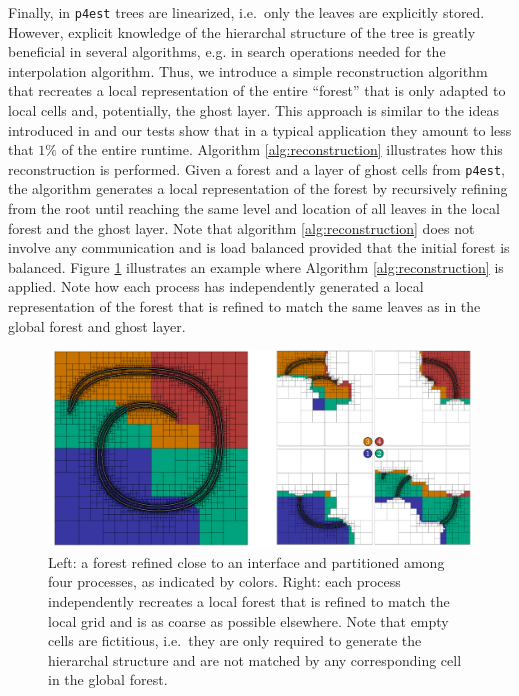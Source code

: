 Finally, in \texttt{p4est} trees are linearized, i.e.\ only the leaves are explicitly stored. However, explicit knowledge of the hierarchal structure of the tree is greatly beneficial in several algorithms, e.g. in search operations needed for the interpolation algorithm. Thus, we introduce a simple reconstruction algorithm that recreates a local representation of the entire ``forest'' that is only adapted to local cells and, potentially, the ghost layer. This approach is similar to the ideas introduced in \cite{Bangerth;Burstedde;Heister;etal:11:Algorithms-and-data-} and our tests show that in a typical application they amount to less that $1\%$ of the entire runtime. Algorithm \ref{alg:reconstruction} illustrates how this reconstruction is performed. Given a forest and a layer of ghost cells from \texttt{p4est}, the algorithm generates a local representation of the forest by recursively refining from the root until reaching the same level and location of all leaves in the local forest and the ghost layer. Note that algorithm \ref{alg:reconstruction} does not involve any communication and is load balanced provided that the initial forest is balanced. Figure \ref{fig:reconstruction} illustrates an example where Algorithm \ref{alg:reconstruction} is applied. Note how each process has independently generated a local representation of the forest that is refined to match the same leaves as in the global forest and ghost layer.
\begin{figure}[htbp]
\begin{center}
\includegraphics[width = \textwidth]{figures/reconstruct.pdf}
\end{center}
\caption{Left: a forest refined close to an interface and partitioned among four processes, as indicated by colors. Right: each process independently recreates a local forest that is refined to match the local grid and is as coarse as possible elsewhere. Note that empty cells are fictitious, i.e.\ they are only required to generate the hierarchal structure and are not matched by any corresponding cell in the global forest.}
\label{fig:reconstruction}
\end{figure}
